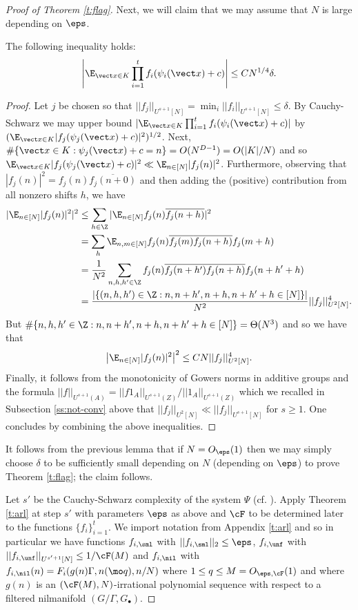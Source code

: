 \begin{proof}[Proof of Theorem \ref{t:flag}]
Next, we will claim that we may assume that $N$ is large depending on $\eps$. 
\begin{lemma}\label{l:smallN}
The following inequality holds:
 \[ \left|\E_{\vect x \in K} \prod_{i=1}^t f_i(\psi_i(\vect x)+c)\right| \leq CN^{1/4}\delta.\]
\end{lemma}
\begin{proof}
Let $j$ be chosen so that $||f_j||_{U^{s+1}[N]} = \min_i ||f_i||_{U^{s+1}[N]} \leq \delta$. By Cauchy-Schwarz we may upper bound $|\E_{\vect x \in K} \prod_{i=1}^t f_i(\psi_i(\vect x)+c)|$ by $(\E_{\vect x \in K}|f_j(\psi_j(\vect x)+c)|^2)^{1/2}$. Next, $\#\{\vect x \in K : \psi_j(\vect x) + c = n\} = O(N^{D-1}) = O(|K|/N)$ and so $\E_{\vect x \in K}|f_j(\psi_j(\vect x)+c)|^2 \ll \E_{n \in [N]}|f_j(n)|^2$. Furthermore, observing that $|f_j(n)|^2 = f_j(n)\overline{f_j(n+0)}$ and then adding the (positive) contribution from all nonzero shifts $h$, we have
\begin{align*}
|\E_{n \in [N]}|f_j(n)|^2|^2 &\leq  \sum_{h\in \Z} |\E_{n \in [N]}f_j(n)\overline{f_j(n+h)}|^2\\
&= \sum_h \E_{n,m \in [N]}f_j(n)\overline{f_j(m)}\overline{f_j(n+h)}f_j(m+h)\\
&= \frac{1}{N^2} \sum_{n,h,h' \in \Z} f_j(n)\overline{f_j(n+h')}\overline{f_j(n+h)}f_j(n+h'+h)\\
&= \frac{\left|\{(n,h,h')\in \Z: n,n+h',n+h,n+h'+h \in [N]\}\right|}{N^2}||f_j||_{U^2[N]}^4.
\end{align*}
But $\#\{n,h,h'\in \Z: n,n+h',n+h,n+h'+h \in [N]\} = \Theta(N^3)$ and so we have that 
\[\left|\E_{n \in [N]}|f_j(n)|^2\right|^2 \leq CN||f_j||_{U^2[N]}^4. \]
Finally, it follows from the monotonicity of Gowers norms in additive groups and the formula $ ||f||_{U^{s+1}{(A)}} =  ||f1_A||_{U^{s+1}{(Z)}}/||1_A||_{U^{s+1}{(Z)}}$ which we recalled in Subsection \ref{ss:not-conv} above that $||f_j||_{U^2[N]} \ll ||f_j||_{U^{s+1}[N]}$ for $s \geq 1$. One concludes by combining the above inequalities. 
\end{proof}
It follows from the previous lemma that if $N = O_\eps(1)$ then we may simply choose $\delta$ to be sufficiently small depending on $N$ (depending on $\eps$) to prove Theorem \ref{t:flag}; the claim follows.
 


Let $s'$ be the Cauchy-Schwarz complexity of the system $\Psi$ (cf. \cite[Definition 1.3.2]{T12}). Apply Theorem \ref{t:arl} at step $s'$ with parameters $\eps$ as above and $\cF$ to be determined later to the functions  $\{  f_i\}_{i=1}^t$. We import notation from Appendix \ref{t:arl} and so in particular we have functions $ f_{i,\sml}$ with $|| f_{i,\sml}||_2 \leq \eps$, $ f_{i,\unf}$ with $|| f_{i,\unf}||_{U^{s'+1}[N]} \leq 1/\cF(M)$ and $ f_{i,\nil}$ with $ f_{i,\nil}(n) = F_i(g(n)\Gamma, n (\mo q), n/N)$ where $1 \leq q \leq M = O_{\eps, \cF}(1)$ and where $g(n)$ is an $(\cF (M),N)$-irrational polynomial sequence with respect to a filtered nilmanifold $(G/\Gamma, G_\bullet)$.



\end{proof}
